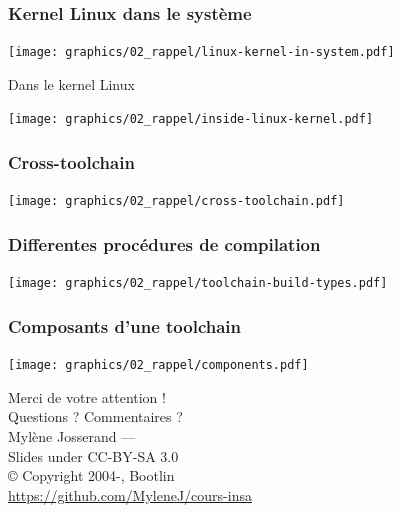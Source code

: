 \documentclass[aspectratio=169,obeyspaces,spaces,hyphens,dvipsnames]{beamer}
\begin{document}
\begin{frame}
  \frametitle{Kernel Linux dans le système}
  \begin{center}
    \texttt{[image: graphics/02\_rappel/linux-kernel-in-system.pdf]}
  \end{center}
\end{frame}


\begin{frame}{Dans le kernel Linux}
  \begin{center}
    \texttt{[image: graphics/02\_rappel/inside-linux-kernel.pdf]}
  \end{center}
\end{frame}

\begin{frame}
  \frametitle{Cross-toolchain}
  \begin{center}
    \texttt{[image: graphics/02\_rappel/cross-toolchain.pdf]}
  \end{center}
\end{frame}

\begin{frame}
  \frametitle{Differentes procédures de compilation}
  \begin{center}
    \texttt{[image: graphics/02\_rappel/toolchain-build-types.pdf]}
  \end{center}
\end{frame}

\begin{frame}
  \frametitle{Composants d'une toolchain}
  \begin{center}
    \texttt{[image: graphics/02\_rappel/components.pdf]}
  \end{center}
\end{frame}

\begin{frame}
  \begin{center}
    \Huge
    Merci de votre attention ! \\
    Questions ? Commentaires ?\\
    \vspace{1cm}
    \large
    Mylène Josserand — \\
    \vspace{1cm}
    Slides under CC-BY-SA 3.0\\
    \scriptsize{© Copyright 2004-\the\year, Bootlin\\
    \url{https://github.com/MyleneJ/cours-insa}}
  \end{center}
\end{frame}
\end{document}
